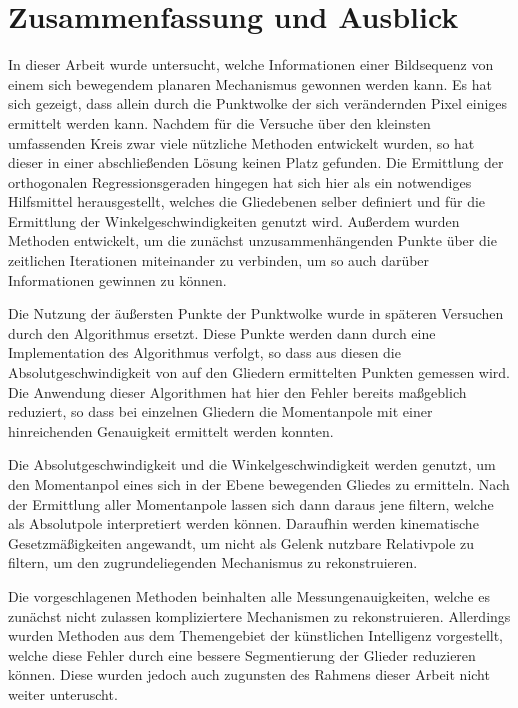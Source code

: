 
\chapter{Zusammenfassung und Ausblick} \label{ch:zusammenfassung_ausblick}


In dieser Arbeit wurde untersucht, welche Informationen einer Bildsequenz von einem sich bewegendem planaren Mechanismus gewonnen werden kann.
Es hat sich gezeigt, dass allein durch die Punktwolke der sich verändernden Pixel einiges ermittelt werden kann.
Nachdem für die Versuche über den kleinsten umfassenden Kreis zwar viele nützliche Methoden entwickelt wurden, so hat dieser in einer abschlie{\ss}enden Lösung keinen Platz gefunden.
Die Ermittlung der orthogonalen Regressionsgeraden hingegen hat sich hier als ein notwendiges Hilfsmittel herausgestellt, welches die Gliedebenen selber definiert und für die Ermittlung der Winkelgeschwindigkeiten genutzt wird.
Au{\ss}erdem wurden Methoden entwickelt, um die zunächst unzusammenhängenden Punkte über die zeitlichen Iterationen miteinander zu verbinden, um so auch darüber Informationen gewinnen zu können.

Die Nutzung der äu{\ss}ersten Punkte der Punktwolke wurde in späteren Versuchen durch den  Algorithmus ersetzt.
Diese Punkte werden dann durch eine Implementation des  Algorithmus verfolgt, so dass aus diesen die Absolutgeschwindigkeit von auf den Gliedern ermittelten Punkten gemessen wird.
Die Anwendung dieser Algorithmen hat hier den Fehler bereits ma{\ss}geblich reduziert, so dass bei einzelnen Gliedern die Momentanpole mit einer hinreichenden Genauigkeit ermittelt werden konnten.

Die Absolutgeschwindigkeit und die Winkelgeschwindigkeit werden genutzt, um den Momentanpol eines sich in der Ebene bewegenden Gliedes zu ermitteln.
Nach der Ermittlung aller Momentanpole lassen sich dann daraus jene filtern, welche als Absolutpole interpretiert werden können.
Daraufhin werden kinematische Gesetzmä{\ss}igkeiten angewandt, um nicht als Gelenk nutzbare Relativpole zu filtern, um den zugrundeliegenden Mechanismus zu rekonstruieren.

Die vorgeschlagenen Methoden beinhalten alle Messungenauigkeiten, welche es zunächst nicht zulassen kompliziertere Mechanismen zu rekonstruieren.
Allerdings wurden Methoden aus dem Themengebiet der künstlichen Intelligenz vorgestellt, welche diese Fehler durch eine bessere Segmentierung der Glieder reduzieren können.
Diese wurden jedoch auch zugunsten des Rahmens dieser Arbeit nicht weiter unteruscht.

